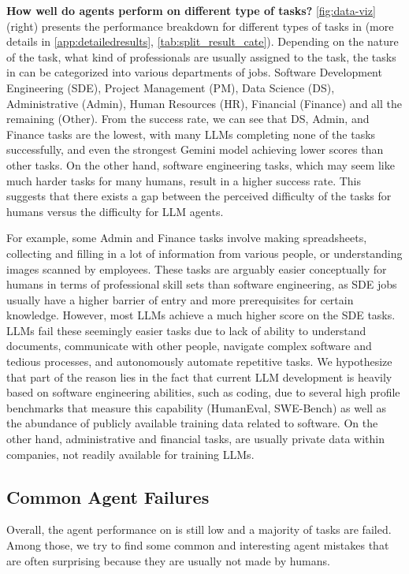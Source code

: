 \documentclass{article}
\begin{document}
\noindent \textbf{How well do agents perform on different type of tasks?} \quad
\autoref{fig:data-viz} (right) presents the performance breakdown for different types of tasks in \tac (more details in \autoref{app:detailedresults}, \autoref{tab:split_result_cate}).
Depending on the nature of the task, \ie what kind of professionals are usually assigned to the task, the tasks in \tac can be categorized into various departments of jobs. Software Development Engineering (SDE), Project Management (PM), Data Science (DS), Administrative (Admin), Human Resources (HR), Financial (Finance) and all the remaining (Other).
From the success rate, we can see that DS, Admin, and Finance tasks are the lowest, with many LLMs completing none of the tasks successfully, and even the strongest Gemini model achieving lower scores than other tasks.
On the other hand, software engineering tasks, which may seem like much harder tasks for many humans, result in a higher success rate.
This suggests that there exists a gap between the perceived difficulty of the tasks for humans versus the difficulty for LLM agents.

For example, some Admin and Finance tasks involve making spreadsheets, collecting and filling in a lot of information from various people, or understanding images scanned by employees.
These tasks are arguably easier conceptually for humans in terms of professional skill sets than software engineering, as SDE jobs usually have a higher barrier of entry and more prerequisites for certain knowledge.
However, most LLMs achieve a much higher score on the SDE tasks.
LLMs fail these seemingly easier tasks due to lack of ability to understand documents, communicate with other people, navigate complex software and tedious processes, and autonomously automate repetitive tasks.
We hypothesize that part of the reason lies in the fact that current LLM development is heavily based on software engineering abilities, such as coding, due to several high profile benchmarks that measure this capability (\eg HumanEval, SWE-Bench) as well as the abundance of publicly available training data related to software.
On the other hand, administrative and financial tasks, are usually private data within companies, not readily available for training LLMs.

\subsection{Common Agent Failures}
\vspace{-1mm}
Overall, the agent performance on \tac is still low and a majority of tasks are failed. Among those, we try to find some common and interesting agent mistakes that are often surprising because they are usually not made by humans.
\end{document}
